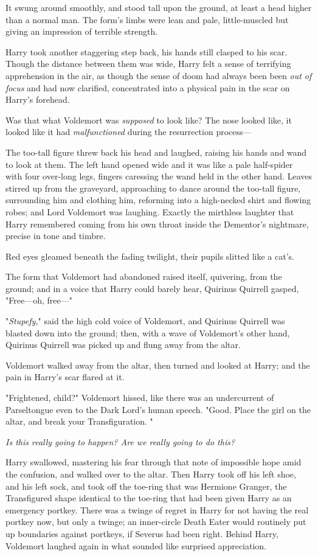 It swung around smoothly, and stood tall upon the ground, at least a head
higher than a normal man. The form's limbs were lean and pale, little-muscled
but giving an impression of terrible strength.

Harry took another staggering step back, his hands still clasped to his scar.
Though the distance between them was wide, Harry felt a sense of terrifying
apprehension in the air, as though the sense of doom had always been been
\emph{out of focus} and had now clarified, concentrated into a physical pain in
the scar on Harry's forehead.

Was that what Voldemort was \emph{supposed} to look like? The nose looked like,
it looked like it had \emph{malfunctioned} during the resurrection process---

The too-tall figure threw back his head and laughed, raising his hands and wand
to look at them. The left hand opened wide and it was like a pale half-spider
with four over-long legs, fingers caressing the wand held in the other hand.
Leaves stirred up from the graveyard, approaching to dance around the too-tall
figure, surrounding him and clothing him, reforming into a high-necked shirt
and flowing robes; and Lord Voldemort was laughing. Exactly the mirthless
laughter that Harry remembered coming from his own throat inside the Dementor's
nightmare, precise in tone and timbre.

Red eyes gleamed beneath the fading twilight, their pupils slitted like a cat's.

The form that Voldemort had abandoned raised itself, quivering, from the
ground; and in a voice that Harry could barely hear, Quirinus Quirrell gasped,
"Free---oh, free---"

"\emph{Stupefy,}" said the high cold voice of Voldemort, and Quirinus Quirrell
was blasted down into the ground; then, with a wave of Voldemort's other hand,
Quirinus Quirrell was picked up and flung away from the altar.

Voldemort walked away from the altar, then turned and looked at Harry; and the
pain in Harry's scar flared at it.

"Frightened, child?" Voldemort hissed, like there was an undercurrent of
Parseltongue even to the Dark Lord's human speech. "Good. Place the girl on the
altar, and break your Transfiguration. "

\emph{Is this really going to happen? Are we really going to do this?}

Harry swallowed, mastering his fear through that note of impossible hope amid
the confusion, and walked over to the altar. Then Harry took off his left shoe,
and his left sock, and took off the toe-ring that was Hermione Granger, the
Transfigured shape identical to the toe-ring that had been given Harry as an
emergency portkey. There was a twinge of regret in Harry for not having the
real portkey now, but only a twinge; an inner-circle Death Eater would
routinely put up boundaries against portkeys, if Severus had been right. Behind
Harry, Voldemort laughed again in what sounded like surprised appreciation.

